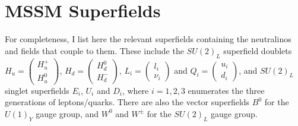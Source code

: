\documentclass[english, notitlepage]{article}
\begin{document}
\section{MSSM Superfields}
    For completeness, I list here the relevant superfields containing the
    neutralinos and fields that couple to them. These include the $SU(2)_L$
    superfield doublets $H_u = \begin{pmatrix} H_u^+ \\ H_u^0 \end{pmatrix}$, $H_d = \begin{pmatrix} H_d^0 \\ H_d^- \end{pmatrix}$, $L_i = \begin{pmatrix} l_i \\ \nu_i \end{pmatrix}$ and $Q_i = \begin{pmatrix} u_i \\ d_i \end{pmatrix}$, and $SU(2)_L$ singlet superfields $E_i$, $U_i$ and $D_i$, where \(i=1,2,3\) enumerates the three generations of leptons/quarks. There are also the vector superfields $B^0$ for the $U(1)_Y$ gauge group, and $W^0$ and $W^\pm$ for the $SU(2)_L$ gauge group.
\end{document}
